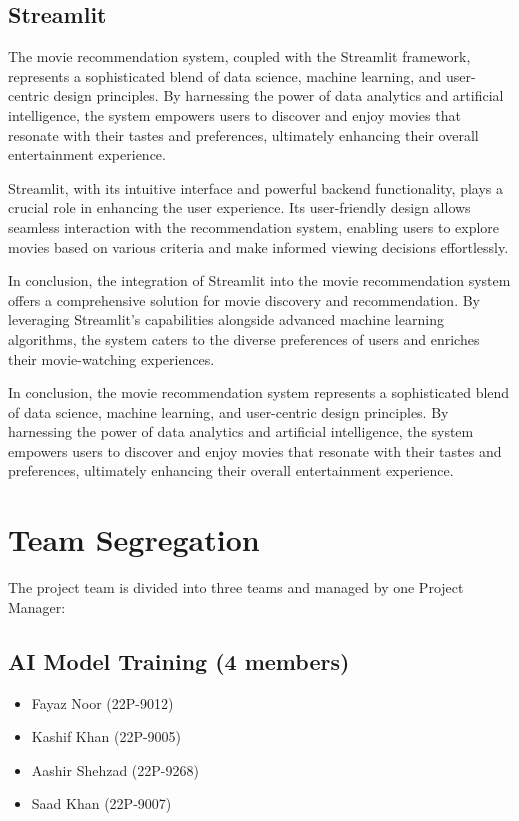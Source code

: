 \documentclass{article}
\begin{document}
\subsection{Streamlit}

The movie recommendation system, coupled with the Streamlit framework, represents a sophisticated blend of data science, machine learning, and user-centric design principles. By harnessing the power of data analytics and artificial intelligence, the system empowers users to discover and enjoy movies that resonate with their tastes and preferences, ultimately enhancing their overall entertainment experience.

Streamlit, with its intuitive interface and powerful backend functionality, plays a crucial role in enhancing the user experience. Its user-friendly design allows seamless interaction with the recommendation system, enabling users to explore movies based on various criteria and make informed viewing decisions effortlessly.

In conclusion, the integration of Streamlit into the movie recommendation system offers a comprehensive solution for movie discovery and recommendation. By leveraging Streamlit's capabilities alongside advanced machine learning algorithms, the system caters to the diverse preferences of users and enriches their movie-watching experiences.


In conclusion, the movie recommendation system represents a sophisticated blend of data science, machine learning, and user-centric design principles. By harnessing the power of data analytics and artificial intelligence, the system empowers users to discover and enjoy movies that resonate with their tastes and preferences, ultimately enhancing their overall entertainment experience.

\section{Team Segregation}

The project team is divided into three teams and managed by one Project Manager:

\subsection{AI Model Training (4 members)}
\begin{itemize}
  \item Fayaz Noor (22P-9012)
  \item Kashif Khan (22P-9005)
  \item Aashir Shehzad (22P-9268)
  \item Saad Khan (22P-9007)
\end{itemize}
\end{document}
